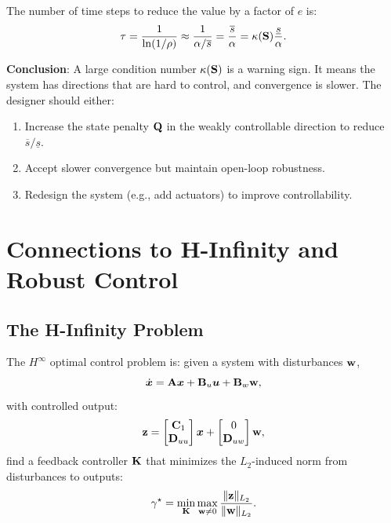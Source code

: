 The number of time steps to reduce the value by a factor of $e$ is:
\begin{equation}
\tau = \frac{1}{\ln(1/\rho)} \approx \frac{1}{\alpha/\overline{s}} = \frac{\overline{s}}{\alpha} = \kappa(\mathbf{S})\frac{\underline{s}}{\alpha}.
\label{eq:ch6:time-constant}
\end{equation}

\textbf{Conclusion}: A large condition number $\kappa(\mathbf{S})$ is a warning sign. It means the system has directions
that are hard to control, and convergence is slower. The designer should either:
\begin{enumerate}
\item Increase the state penalty $\mathbf{Q}$ in the weakly controllable direction to reduce $\overline{s}/\underline{s}$.
\item Accept slower convergence but maintain open-loop robustness.
\item Redesign the system (e.g., add actuators) to improve controllability.
\end{enumerate}

\section{Connections to H-Infinity and Robust Control}

\subsection{The H-Infinity Problem}

The $H^\infty$ optimal control problem is: given a system with disturbances $\mathbf{w}$,
\begin{equation}
\dot{\bm{x}} = \mathbf{A}\bm{x} + \mathbf{B}_u\bm{u} + \mathbf{B}_w\mathbf{w},
\label{eq:ch6:hinf-system}
\end{equation}
with controlled output:
\begin{equation}
\mathbf{z} = \begin{bmatrix} \mathbf{C}_1 \\ \mathbf{D}_{uu} \end{bmatrix}\bm{x} + \begin{bmatrix} 0 \\ \mathbf{D}_{uw} \end{bmatrix}\mathbf{w},
\label{eq:ch6:hinf-output}
\end{equation}
find a feedback controller $\mathbf{K}$ that minimizes the $L_2$-induced norm from disturbances to outputs:
\begin{equation}
\gamma^\star = \min_{\mathbf{K}} \max_{\mathbf{w} \neq 0} \frac{\|\mathbf{z}\|_{L_2}}{\|\mathbf{w}\|_{L_2}}.
\label{eq:ch6:hinf-objective}
\end{equation}

